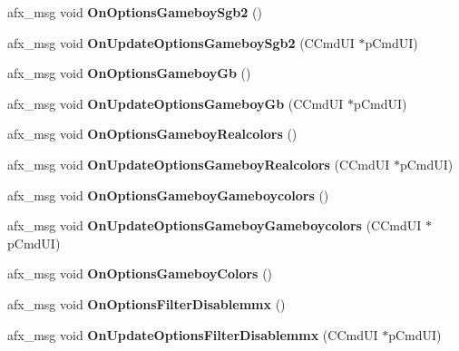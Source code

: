 \begin{DoxyCompactItemize}
afx\+\_\+msg void {\bfseries On\+Options\+Gameboy\+Sgb2} ()
\item 
\mbox{\label{class_main_wnd_af4ff595c3cbb12ff64dd2f485472740c}} 
afx\+\_\+msg void {\bfseries On\+Update\+Options\+Gameboy\+Sgb2} (C\+Cmd\+UI $\ast$p\+Cmd\+UI)
\item 
\mbox{\label{class_main_wnd_a0b2a5caeea62067bd152c9247a52c3fa}} 
afx\+\_\+msg void {\bfseries On\+Options\+Gameboy\+Gb} ()
\item 
\mbox{\label{class_main_wnd_a5a439a63c75a38577924c18e6f8b7bf9}} 
afx\+\_\+msg void {\bfseries On\+Update\+Options\+Gameboy\+Gb} (C\+Cmd\+UI $\ast$p\+Cmd\+UI)
\item 
\mbox{\label{class_main_wnd_a3c22c4fc314110e06499edd9028ad033}} 
afx\+\_\+msg void {\bfseries On\+Options\+Gameboy\+Realcolors} ()
\item 
\mbox{\label{class_main_wnd_ae6d09f6d944ff25a57bfef8b23c77c0c}} 
afx\+\_\+msg void {\bfseries On\+Update\+Options\+Gameboy\+Realcolors} (C\+Cmd\+UI $\ast$p\+Cmd\+UI)
\item 
\mbox{\label{class_main_wnd_a50303dd10fbc876ddb67642295664d50}} 
afx\+\_\+msg void {\bfseries On\+Options\+Gameboy\+Gameboycolors} ()
\item 
\mbox{\label{class_main_wnd_afc1d1c793e24da9855d3dfc0d37fcaaf}} 
afx\+\_\+msg void {\bfseries On\+Update\+Options\+Gameboy\+Gameboycolors} (C\+Cmd\+UI $\ast$p\+Cmd\+UI)
\item 
\mbox{\label{class_main_wnd_a26f32c1e841c679d112a15f00db1d9b2}} 
afx\+\_\+msg void {\bfseries On\+Options\+Gameboy\+Colors} ()
\item 
\mbox{\label{class_main_wnd_aec2034cf5c7ea0ff74b1f81cd29a5e10}} 
afx\+\_\+msg void {\bfseries On\+Options\+Filter\+Disablemmx} ()
\item 
\mbox{\label{class_main_wnd_a8399bcb846d0d5d0fe3d28e8a8232af9}} 
afx\+\_\+msg void {\bfseries On\+Update\+Options\+Filter\+Disablemmx} (C\+Cmd\+UI $\ast$p\+Cmd\+UI)

\end{DoxyCompactItemize}

